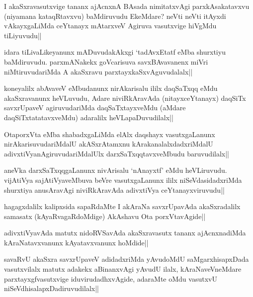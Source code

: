 \begin{artha}%
I akaSxravasutxvige tananx ajAcnxnA BAsada nimitatxvAgi parxkAsakatavxvu (niyamana kataqRtavxvu) baMdiruvudu EkeMdare? neVti neVti itAyxdi vAkayxgaLiMda ceYtanayx mAtarxveV Agiruva vasutxvige hiVgMdu tiLiyuvudu||
\end{artha}

\begin{artha}
idara tiLivaLikeyanunx mADuvudakAkxgi `tadAvxEtatf eMba shurxtiyu baMdiruvudu. parxmANakekx goVcarisuva savxBAvavanenx miVri niMtiruvudariMda A akaSxravu parxtayxkaSxvAguvudalalx||
\end{artha}

\begin{artha}
koneyalilx abAvaveV eMbudanunx nirAkarisalu ililx daqSaTxqq eMdu akaSxravanunx heVLuvudu, Adare niviRkAravAda (nitayxceYtanayx) daqSiTx savxrUpaveV agiruvudariMda daqSaTxtayxveMdu (aMdare daqSiTxtatatavxveMdu) adaralilx heVLapaDuvudilalx||
\end{artha}

\begin{artha}
OtaporxVta eMba shabadxgaLiMda elAlx daqshayx vasutxgaLanunx nirAkarisuvudariMdalU akASxrAtamxnu kArakanalalxdadxriMdalU adivxtiVyanAgiruvudariMdalUlx darxSaTxqqtavxveMbudu baruvudilalx||
\end{artha}


\begin{artha}
aneVka darxSaTxqqgaLanunx nivArisalu `nAnayxtf' eMdu heVLiruvudu. vijAtiVya sajAtiVyaveMbuva beVre vasutxgaLanunx ililx niSeVdasidadxriMda shurxtiya anusAravAgi niviRkAravAda adivxtiVya ceYtanayxviruvudu||
\end{artha}

\begin{artha}
hagagxdalilx kalipxsida sapaRdaMte I akAraNa savxrUpavAda akaSxradalilx samasatx (kAyaRvagaRdoMdige) AkAshavu Ota porxVtavAgide||
\end{artha}

\begin{artha}
adivxtiVyavAda matutx nidoRVSavAda akaSxravasutx tananx ajAcnxnadiMda kAraNatavxvanunx kAyatavxvanunx hoMdide||
\end{artha}

\begin{artha}
savaRvU akaSxra savxrUpaveV adidadxriMda yAvudoMdU saMgarxhisapxDada vasutxvilalx matutx adakekx aBinanxvAgi yAvudU ilalx, kAraNaveVneMdare parxtayxgfvasutxvige iduvirudadhxvAgide, adaraMte oMdu vasutxvU niSeVdhisalapxDadiruvudilalx||
\end{artha}%

